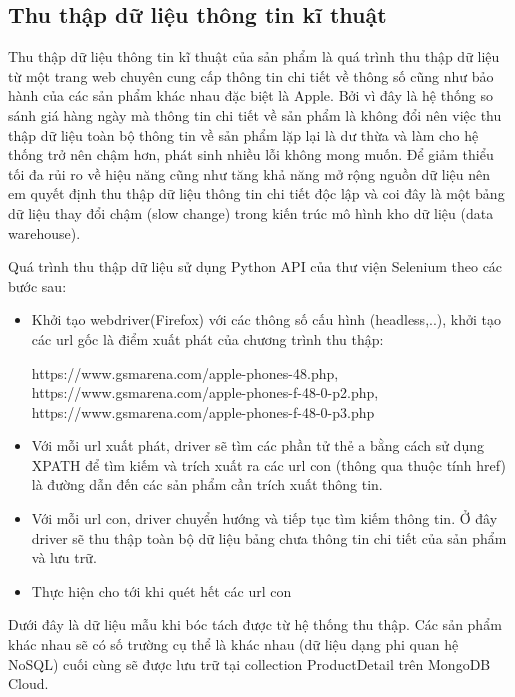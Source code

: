 \documentclass[../DoAn.tex]{subfiles}
\begin{document}
\subsection{Thu thập dữ liệu thông tin kĩ thuật}
\label{subsection:4.2.2.1}
Thu thập dữ liệu thông tin kĩ thuật của sản phẩm là quá trình thu thập dữ liệu từ một trang web chuyên cung cấp thông tin chi tiết về thông số cũng như bảo hành của các sản phẩm khác nhau đặc biệt là Apple. Bởi vì đây là hệ thống so sánh giá hàng ngày mà thông tin chi tiết về sản phẩm là không đổi nên việc thu thập dữ liệu toàn bộ thông tin về sản phẩm lặp lại là dư thừa và làm cho hệ thống trở nên chậm hơn, phát sinh nhiều lỗi không mong muốn. Để giảm thiểu tối đa rủi ro về hiệu năng cũng như tăng khả năng mở rộng nguồn dữ liệu nên em quyết định thu thập dữ liệu thông tin chi tiết độc lập và coi đây là một bảng dữ liệu thay đổi chậm (slow change) trong kiến trúc mô hình kho dữ liệu (data warehouse).

Quá trình thu thập dữ liệu sử dụng Python API của thư viện Selenium theo các bước sau:
\begin{itemize}
    \item Khởi tạo webdriver(Firefox) với các thông số cấu hình (headless,..), khởi tạo các url gốc là điểm xuất phát của chương trình thu thập:
    
    https://www.gsmarena.com/apple-phones-48.php,
    https://www.gsmarena.com/apple-phones-f-48-0-p2.php,
    https://www.gsmarena.com/apple-phones-f-48-0-p3.php
    \item Với mỗi url xuất phát, driver sẽ tìm các phần tử thẻ a bằng cách sử dụng XPATH để tìm kiếm và trích xuất ra các url con (thông qua thuộc tính href) là đường dẫn đến các sản phẩm cần trích xuất thông tin.
    \item Với mỗi url con, driver chuyển hướng và tiếp tục tìm kiếm thông tin. Ở đây driver sẽ thu thập toàn bộ dữ liệu bảng chưa thông tin chi tiết của sản phẩm và lưu trữ.
    \item Thực hiện cho tới khi quét hết các url con 
\end{itemize}
Dưới đây là dữ liệu mẫu khi bóc tách được từ hệ thống thu thập. Các sản phẩm khác nhau sẽ có số trường cụ thể là khác nhau (dữ liệu dạng phi quan hệ NoSQL) cuối cùng sẽ được lưu trữ tại collection ProductDetail trên MongoDB Cloud.
\end{document}
